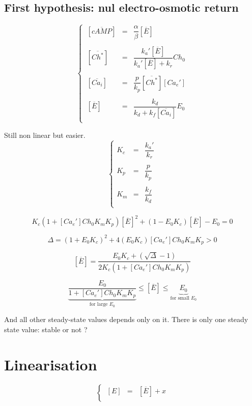 \documentclass[aps,12pt]{revtex4}
\begin{document}
\subsection{First hypothesis: nul electro-osmotic return}
\begin{equation}
\left\lbrace
\begin{array}{lcl}
~[\overline{cAMP}] & = & \dfrac{\alpha}{\beta}[\overline{E}] \\
\\
~[ \overline{Ch^\ast} ] & = & \dfrac{k_a'[\overline{E}]}{k_a'[\overline{E}]+k_r} Ch_0\\
\\
~[\overline{Ca_i}] & = & \dfrac{p}{k_p}[\overline{Ch^\ast}] [Ca_e']\\
\\
~[\overline{E}] & = & \dfrac{k_d}{k_d+k_f[\overline{Ca_i}]} E_0\\
\end{array}
\right.
\end{equation}

Still non linear but easier.
\begin{equation}
\left\lbrace
\begin{array}{lcl}
K_c & = & \dfrac{k_a'}{k_r} \\
\\
K_p & = & \dfrac{p}{k_p} \\
\\
K_m & = & \dfrac{k_f}{k_d}\\
\end{array}
\right.
\end{equation}

\begin{equation}
K_c(1+[Ca_e'] Ch_0 K_m K_p) [\overline{E}]^2 + (1-E_0K_c) [\overline{E}] - E_0 = 0
\end{equation}

\begin{equation}
	\Delta =	(1+E_0 K_c)^2 + 4 (E_0 K_c) [Ca_e'] Ch_0    K_m  K_p > 0
\end{equation}

\begin{equation}
\boxed{
	[\overline{E}] = \dfrac{E_0 K_c + \left(\sqrt{\Delta} - 1\right)}
	{
	2 K_c(1+[Ca_e'] Ch_0 K_m K_p)
	}
}
\end{equation}

\begin{equation}
	\underbrace{\dfrac{E_0}{1+[Ca_e'] Ch_0 K_m K_p}}_{\text{for large $E_0$}}
		\leq	[\overline{E}] \leq \underbrace{E_0}_{\text{for small $E_0$}}
\end{equation}

And all other steady-state values depends only on it.
There is only one steady state value: stable or not ?

\section{Linearisation}

\begin{equation}
\left\lbrace
\begin{array}{lcl}
~[E] & = & [\overline{E}] + x\\
\end{array}
\right.
\end{equation}
\end{document}
